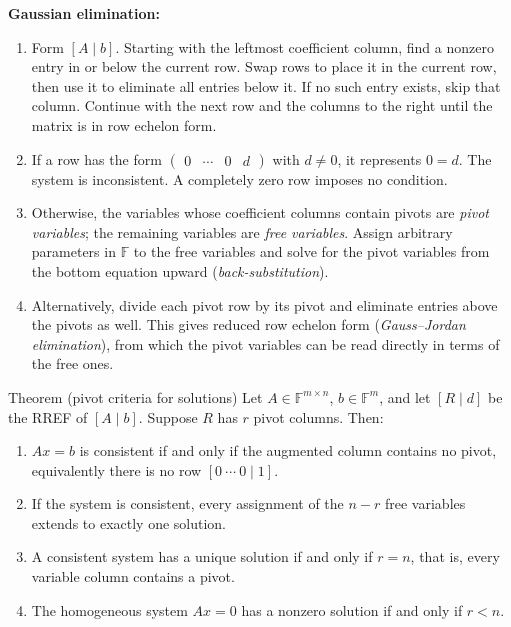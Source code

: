 \documentclass[a4paper,11pt,abstract=true]{scrartcl}
\theoremstyle{dotlessP}
\theoremstyle{dotlessS}
\theoremstyle{remark}
\theoremstyle{definition}
\begin{document}
\begin{claim_box}
\textbf{Gaussian elimination:}
\begin{enumerate}
    \item Form $[A\mid b]$. Starting with the leftmost coefficient
    column, find a nonzero entry in or below the current row. Swap
    rows to place it in the current row, then use it to eliminate all
    entries below it. If no such entry exists, skip that column.
    Continue with the next row and the columns to the right until
    the matrix is in row echelon form.
    \item If a row has the form
    $\left(\begin{array}{ccc|c}0&\cdots&0&d\end{array}\right)$
    with $d\neq0$, it represents $0=d$. The system is inconsistent.
    A completely zero row imposes no condition.
    \item Otherwise, the variables whose coefficient columns contain
    pivots are \emph{pivot variables}; the remaining variables are
    \emph{free variables}. Assign arbitrary parameters in $\mathbb{F}$
    to the free variables and solve for the pivot variables from the
    bottom equation upward (\emph{back-substitution}).
    \item Alternatively, divide each pivot row by its pivot and
    eliminate entries above the pivots as well. This gives reduced
    row echelon form (\emph{Gauss--Jordan elimination}), from which
    the pivot variables can be read directly in terms of the free ones.
\end{enumerate}
\end{claim_box}

\begin{mainbox}{Theorem (pivot criteria for solutions)}
Let
$A\in\mathbb{F}^{m\times n}$, $b\in\mathbb{F}^m$, and let
$[R\mid d]$ be the RREF of $[A\mid b]$. Suppose $R$ has $r$ pivot
columns. Then:
\begin{enumerate}
    \item $Ax=b$ is consistent if and only if the augmented column
    contains no pivot, equivalently there is no row $[0\ \cdots\ 0\mid1]$.
    \item If the system is consistent, every assignment of the $n-r$
    free variables extends to exactly one solution.
    \item A consistent system has a unique solution if and only if
    $r=n$, that is, every variable column contains a pivot.
    \item The homogeneous system $Ax=0$ has a nonzero solution if and
    only if $r<n$.
\end{enumerate}
\end{mainbox}
\end{document}
